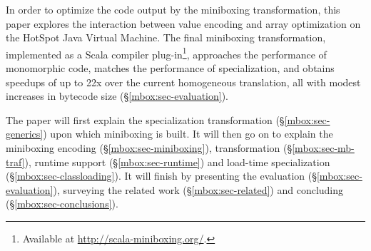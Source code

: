 In order to optimize the code output by the miniboxing transformation, this paper explores the interaction between value encoding and array optimization on the HotSpot Java Virtual Machine. The final miniboxing transformation, implemented as a Scala compiler plug-in\footnote{Available at \url{http://scala-miniboxing.org/}.}, approaches the performance of monomorphic code, matches the performance of specialization, and obtains speedups of up to 22x over the current homogeneous translation, all with modest increases in bytecode size (\S{}\ref{mbox:sec-evaluation}).

The paper will first explain the specialization transformation (\S\ref{mbox:sec-generics}) upon which miniboxing is built. It will then go on to explain the miniboxing encoding (\S\ref{mbox:sec-miniboxing}), transformation (\S\ref{mbox:sec-mb-traf}), runtime support (\S\ref{mbox:sec-runtime}) and load-time specialization (\S\ref{mbox:sec-classloading}). It will finish by presenting the evaluation (\S\ref{mbox:sec-evaluation}), surveying the related work (\S\ref{mbox:sec-related}) and concluding (\S\ref{mbox:sec-conclusions}).  
